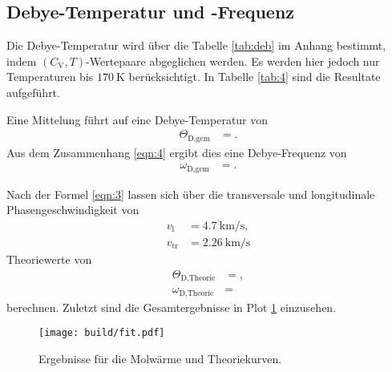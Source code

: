 

\subsection{Debye-Temperatur und -Frequenz}

Die Debye-Temperatur wird über die Tabelle \ref{tab:deb} im Anhang bestimmt, indem $(C_{\text{V}},T)$-Wertepaare abgeglichen werden.
Es werden hier jedoch nur Temperaturen bis $\SI{170}{\kelvin}$ berücksichtigt.
In Tabelle \ref{tab:4} sind die Resultate aufgeführt.



Eine Mittelung führt auf eine Debye-Temperatur von
\begin{align*}
  \Theta_{\text{D,gem}} &= .
\end{align*}
Aus dem Zusammenhang \eqref{eqn:4} ergibt dies eine Debye-Frequenz von
\begin{align*}
  \omega_{\text{D,gem}} &= .
\end{align*}

Nach der Formel \eqref{eqn:3} lassen sich über die transversale und longitudinale Phasengeschwindigkeit von
\begin{align*}
  v_{\text{l}}  &= \SI{4.7}{\kilo\meter\per\second},\\
  v_{\text{tr}} &= \SI{2.26}{\kilo\meter\per\second}
\end{align*}
Theoriewerte von
\begin{align*}
  \Theta_{\text{D,Theorie}} &= ,\\
  \omega_{\text{D,Theorie}} &= 
\end{align*}
berechnen.
Zuletzt sind die Gesamtergebnisse in Plot \ref{plot:1} einzusehen.

\begin{figure}
  \centering
  \texttt{[image: build/fit.pdf]}
  \caption{Ergebnisse für die Molwärme und Theoriekurven.}
  \label{plot:1}
\end{figure}
